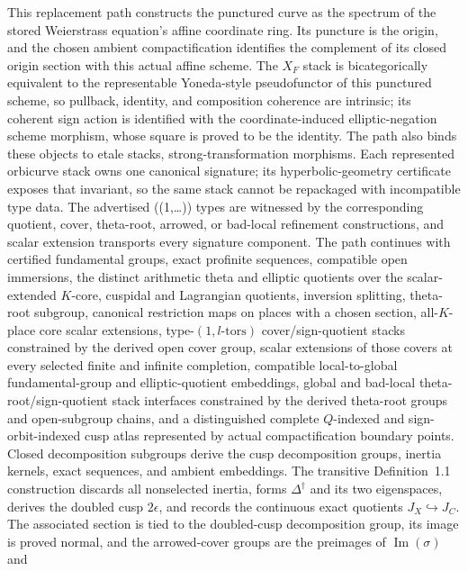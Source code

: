 \begin{definition}
  This replacement path constructs the punctured curve as the spectrum of the
  stored Weierstrass equation's affine coordinate ring.  Its puncture is the
  origin, and the chosen ambient compactification identifies the complement of
  its closed origin section with this actual affine scheme.  The \(X_F\) stack is bicategorically equivalent to the
  representable Yoneda-style pseudofunctor of this punctured scheme, so
  pullback, identity, and composition coherence are intrinsic; its coherent sign action
  is identified with the coordinate-induced elliptic-negation scheme morphism,
  whose square is proved to be the identity.  The path also binds these objects to etale stacks, strong-transformation
  morphisms.  Each represented orbicurve stack owns one canonical signature;
  its hyperbolic-geometry certificate exposes that invariant, so the same
  stack cannot be repackaged with incompatible type data.  The advertised
  ((1,\ldots)) types are witnessed by the corresponding quotient, cover,
  theta-root, arrowed, or bad-local refinement constructions, and scalar
  extension transports every signature component.  The path continues with
  certified fundamental groups, exact profinite sequences,
  compatible open immersions, the distinct arithmetic theta and elliptic
  quotients over the scalar-extended \(K\)-core, cuspidal and Lagrangian
  quotients, inversion splitting, theta-root subgroup, canonical restriction
  maps on places with a chosen section, all-\(K\)-place core scalar extensions,
  type-\((1,l\text{-tors})\)
  cover/sign-quotient stacks constrained by the derived open cover group,
  scalar extensions of those covers at every selected finite and infinite
  completion, compatible local-to-global fundamental-group and elliptic-quotient
  embeddings,
  global and bad-local theta-root/sign-quotient stack interfaces constrained
  by the derived theta-root groups and open-subgroup chains, and a distinguished
  complete \(Q\)-indexed and sign-orbit-indexed cusp atlas represented by
  actual compactification boundary points.  Closed decomposition subgroups
  derive the cusp decomposition groups, inertia kernels, exact sequences, and
  ambient embeddings.  The transitive
  Definition~1.1 construction discards all nonselected inertia, forms
  \(\Delta^\dagger\) and its two eigenspaces, derives the doubled cusp
  \(2\epsilon\), and records the continuous exact quotients
  \(J_X\hookrightarrow J_C\).  The associated section is tied to the
  doubled-cusp decomposition group, its image is proved normal, and the
  arrowed-cover groups are the preimages of
  \(\operatorname{Im}(\sigma)\) and

\end{definition}
